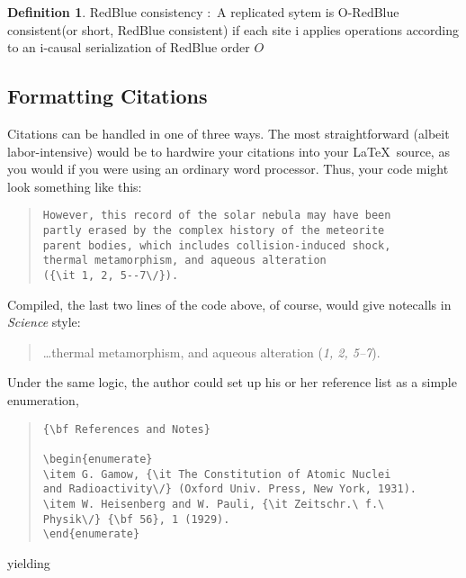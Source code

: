 \documentclass[12pt]{article}
\theoremstyle{plain}
\theoremstyle{definition}
\newtheorem{defn}{Definition}[section]
\theoremstyle{remark}
\begin{document}
\begin{defn}
RedBlue consistency $\colon$ A replicated sytem is O-RedBlue consistent(or short, RedBlue consistent) if each site i applies operations according to an i-causal serialization of RedBlue order $O$
\end{defn}
\subsection*{Formatting Citations}

Citations can be handled in one of three ways.  The most
straightforward (albeit labor-intensive) would be to hardwire your
citations into your \LaTeX\ source, as you would if you were using an
ordinary word processor.  Thus, your code might look something like
this:


\begin{quote}
\begin{verbatim}
However, this record of the solar nebula may have been
partly erased by the complex history of the meteorite
parent bodies, which includes collision-induced shock,
thermal metamorphism, and aqueous alteration
({\it 1, 2, 5--7\/}).
\end{verbatim}
\end{quote}


\noindent Compiled, the last two lines of the code above, of course, would give notecalls in {\it Science\/} style:

\begin{quote}
\ldots thermal metamorphism, and aqueous alteration ({\it 1, 2, 5--7\/}).
\end{quote}

Under the same logic, the author could set up his or her reference list as a simple enumeration,

\begin{quote}
\begin{verbatim}
{\bf References and Notes}

\begin{enumerate}
\item G. Gamow, {\it The Constitution of Atomic Nuclei
and Radioactivity\/} (Oxford Univ. Press, New York, 1931).
\item W. Heisenberg and W. Pauli, {\it Zeitschr.\ f.\ 
Physik\/} {\bf 56}, 1 (1929).
\end{enumerate}
\end{verbatim}
\end{quote}

\noindent yielding
\end{document}
